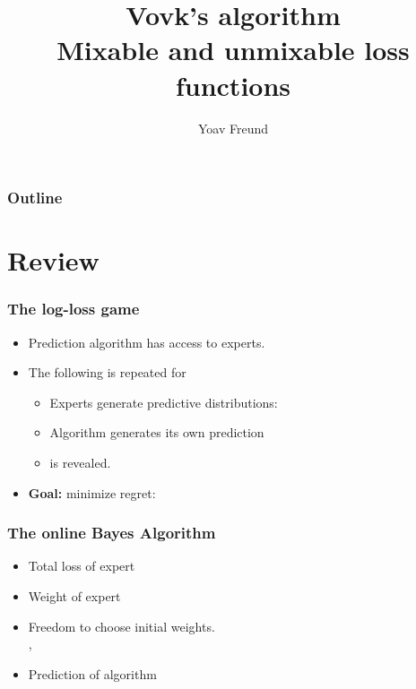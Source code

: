 \documentclass{beamer}
\title [Vovk's algorithm] %
{Vovk's algorithm \\ Mixable and unmixable loss functions}
\author[Freund] %
{Yoav Freund}
\institute[Universities of Somewhere and Elsewhere] %
\begin{document}
%

\begin{frame}
  \titlepage
\end{frame}

\begin{frame}
  \frametitle{Outline}
  \tableofcontents[pausesections]
\end{frame}

\section{Review}

\begin{frame}
\frametitle{The log-loss game}
\begin{itemize}
\item Prediction algorithm  has access to  experts.
\item The following is repeated for 
\begin{itemize}
\item Experts generate predictive distributions: 
\item Algorithm generates its own prediction 
\item {} is revealed.
\end{itemize}
\item {\bf Goal:} minimize regret:
\R{\[
-\sum_{t=1}^T \log p_A^t(c^t) + \min_{i=1,\dots,N} \paren{-\sum_{t=1}^T \log p_i^t(c^t)} 
\]}
\end{itemize}

\end{frame}

\begin{frame}
\frametitle{The online Bayes Algorithm}
\begin{itemize}
\item {\color{blue} Total loss} of expert 
\item {\color{blue}Weight} of expert 
\item
Freedom to choose initial weights.\\
 , 
\item {\color{blue}Prediction} of algorithm 
\R{\[
\vp_A^t = \frac{\sum_{i=1}^N \wt{t}{i} \vp_i^t}{\sum_{i=1}^N \wt{t}{i}}
\]}
\end{itemize}
\end{frame}
\end{document}
